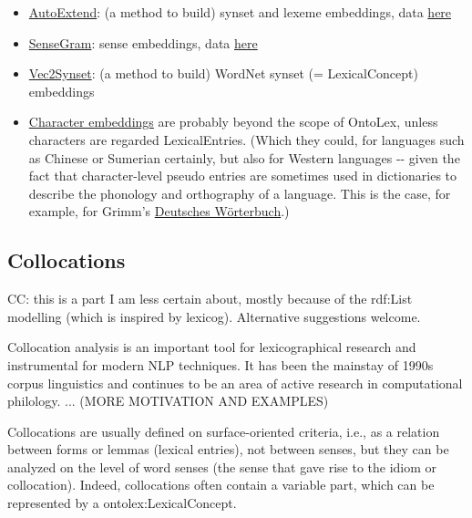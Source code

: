 \documentclass[a4paper]{article}
\newcommand\textstyleInternetlink[1]{\textcolor[rgb]{0.0,0.0,0.5019608}{#1}}
\newcommand\textstyleTeletype[1]{\textrm{#1}}
\newcommand\liststyleWWNumvii{%
\renewcommand\labelitemi{[F0B7?]}
\renewcommand\labelitemii{[F0B7?]}
\renewcommand\labelitemiii{[F0B7?]}
\renewcommand\labelitemiv{[F0B7?]}
}
\begin{document}
\liststyleWWNumvii
\begin{itemize}
\item \href{http://www.cis.lmu.de/~sascha/AutoExtend/}{\textstyleInternetlink{AutoExtend}}: (a method to build) synset and lexeme embeddings, data \href{http://www.cis.lmu.de/~sascha/AutoExtend/embeddings.zip}{\textstyleInternetlink{here}} 
\item \href{https://github.com/uhh-lt/sensegram}{\textstyleInternetlink{SenseGram}}: sense embeddings, data \href{http://ltdata1.informatik.uni-hamburg.de/sensegram/}{\textstyleInternetlink{here}} 
\item \href{http://tudarmstadt-lt.github.io/vec2synset/}{\textstyleInternetlink{Vec2Synset}}: (a method to build) WordNet synset (= LexicalConcept) embeddings 
\item \href{https://minimaxir.com/2017/04/char-embeddings/}{\textstyleInternetlink{Character embeddings}} are probably beyond the scope of OntoLex, unless characters are regarded LexicalEntries. (Which they could, for languages such as Chinese or Sumerian certainly, but also for Western languages -{}- given the fact that character-level pseudo entries are sometimes used in dictionaries to describe the phonology and orthography of a language. This is the case, for example, for Grimm's \href{http://woerterbuchnetz.de/cgi-bin/WBNetz/wbgui_py?sigle=DWB}{\textstyleInternetlink{Deutsches Wörterbuch}}.) 
\end{itemize}
\subsection{Collocations}
CC: this is a part I am less certain about, mostly because of the rdf:List modelling (which is inspired by lexicog). Alternative suggestions welcome.

Collocation analysis is an important tool for lexicographical research and instrumental for modern NLP techniques. It has been the mainstay of 1990s corpus linguistics and continues to be an area of active research in computational philology. ... (MORE MOTIVATION AND EXAMPLES)

Collocations are usually defined on surface-oriented criteria, i.e., as a relation between forms or lemmas (lexical entries), not between senses, but they can be analyzed on the level of word senses (the sense that gave rise to the idiom or collocation). Indeed, collocations often contain a variable part, which can be represented by a \textstyleTeletype{ontolex:LexicalConcept}.
\end{document}
